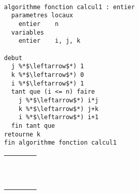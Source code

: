 \documentclass[11pt,a4paper]{article}
\begin{document}
\begin{table}[h!]
  \centering
  \begin{minipage}{0.59\textwidth}
    \centering
\begin{lstlisting}[style=algorithm]

algorithme fonction calcul1 : entier
  parametres locaux
    entier    n
  variables
    entier    i, j, k

debut
  j %*$\leftarrow$*) 1
  k %*$\leftarrow$*) 0
  i %*$\leftarrow$*) 1
  tant que (i <= n) faire
    j %*$\leftarrow$*) i*j
    k %*$\leftarrow$*) j+k
    i %*$\leftarrow$*) i+1
  fin tant que
retourne k
fin algorithme fonction calcul1
 \end{lstlisting}
  \end{minipage}
  \hfillx
  \begin{minipage}{0.4\textwidth}
    \centering
    \begin{tabular}{|C{1cm}|C{1cm}|C{1cm}|C{1cm}|}
        \hline
             &     &     &     \\
        \hline
             &     &     &   \\
             &     &     &     \\
             &     &     &   \\
        \hline
             &     &     &   \\
             &     &     &     \\
             &     &     &   \\
        \hline
             &     &     &   \\
             &     &     &     \\
             &     &     &   \\
        \hline
             &     &     &   \\
             &     &     &     \\

\end{tabular}
\end{minipage}
\end{table}
\end{document}
